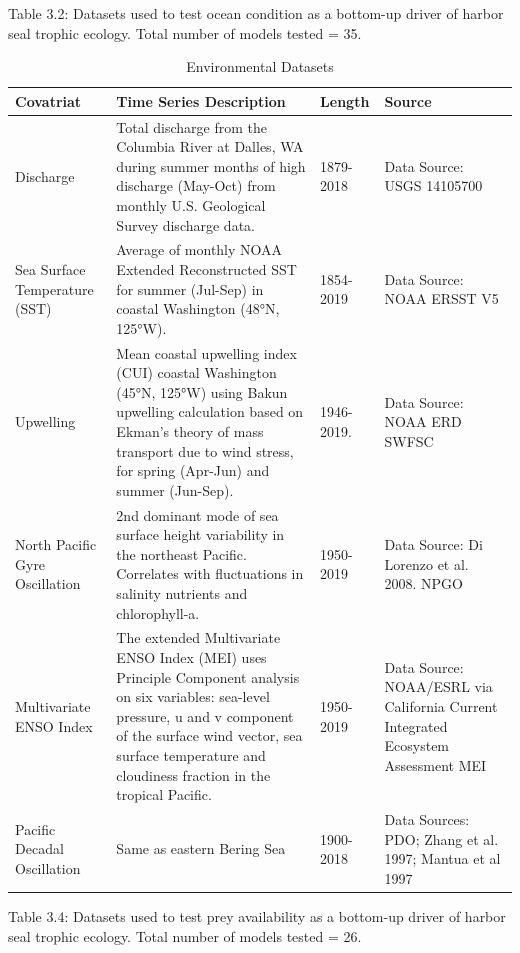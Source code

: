 \documentclass [11pt, proquest] {uwthesis}[2015/03/03]
\begin{document}
\clearpage
\begin{landscape}
Table 3.2: Datasets used to test ocean condition as a bottom-up driver of harbor seal trophic ecology. Total number of models tested = 35.

\begingroup\fontsize{8}{10}\selectfont
\begin{longtable}[t]{l>{\raggedright\arraybackslash}p{27em}l>{\raggedright\arraybackslash}p{27em}}
\caption{\label{tab:envdat}Environmental Datasets}\\
\toprule
Covatriat & Time Series Description & Length & Source\\
\midrule
Discharge & Total discharge from the Columbia River at Dalles, WA during summer months of high discharge (May-Oct) from monthly U.S. Geological Survey discharge data. & 1879-2018 & Data Source: USGS 14105700\\
Sea Surface Temperature (SST) & Average of monthly NOAA Extended Reconstructed SST for summer (Jul-Sep) in coastal Washington (48°N, 125°W). & 1854-2019 & Data Source: NOAA ERSST V5\\
Upwelling & Mean coastal upwelling index (CUI) coastal Washington (45°N, 125°W) using Bakun upwelling calculation based on Ekman's theory of mass transport due to wind stress, for spring (Apr-Jun) and summer (Jun-Sep). & 1946-2019. & Data Source: NOAA ERD SWFSC\\
North Pacific Gyre Oscillation & 2nd dominant mode of sea surface height variability in the northeast Pacific. Correlates with fluctuations in salinity nutrients and chlorophyll-a. & 1950-2019 & Data Source: Di Lorenzo et al. 2008.  NPGO\\
Multivariate ENSO Index & The extended Multivariate ENSO Index (MEI) uses Principle Component analysis on six variables: sea-level pressure, u and v component of the surface wind vector, sea surface temperature and cloudiness fraction in the tropical Pacific. & 1950-2019 & Data Source:  NOAA/ESRL via California Current Integrated Ecosystem Assessment MEI\\
\addlinespace
Pacific Decadal Oscillation & Same as eastern Bering Sea & 1900-2018 & Data Sources: PDO; Zhang et al. 1997; Mantua et al 1997\\
\bottomrule
\end{longtable}
\endgroup{}
\clearpage

Table 3.4:  Datasets used to test prey availability as a bottom-up driver of harbor seal trophic ecology. Total number of models tested = 26.


\end{landscape}
\end{document}
